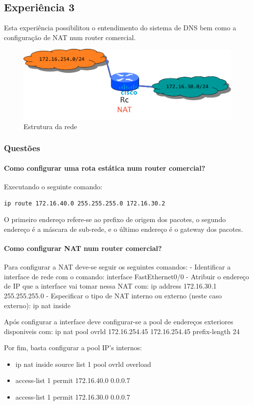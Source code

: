 \subsection{Experiência 3}

Esta experiência possibilitou o entendimento do sistema de DNS bem como a configuração de NAT num router comercial.

\begin{figure}[!h]
\centering
  \includegraphics[width=.4\linewidth]{img/net-routing-nat-cisco.png}
  \caption{Estrutura da rede}
\end{figure}

\subsubsection{Questões}

\paragraph{Como configurar uma rota estática num router comercial?}

Executando o seguinte comando:  
    \begin{center} \lstinline{ip route 172.16.40.0 255.255.255.0 172.16.30.2} \end{center}

O primeiro endereço refere-se ao prefixo de origem dos pacotes, o segundo endereço é a máscara de sub-rede, e o último endereço é o gateway dos pacotes.

\paragraph{Como configurar NAT num router comercial?}
Para configurar a NAT deve-se seguir os seguintes comandos:
 - Identificar a interface de rede com o comando: interface FastEthernet0/0
 - Atribuir o endereço de IP que a interface vai tomar nessa NAT com: ip address 172.16.30.1 255.255.255.0
 - Especificar o tipo de NAT interno ou externo (neste caso externo): ip nat inside

Após configurar a interface deve configurar-se a pool de endereços exteriores disponiveis com: ip nat pool ovrld 172.16.254.45 172.16.254.45 prefix-length 24

Por fim, basta configurar a pool IP's internos:
\begin{itemize}
    \item ip nat inside source list 1 pool ovrld overload
    \item access-list 1 permit 172.16.40.0 0.0.0.7
    \item access-list 1 permit 172.16.30.0 0.0.0.7
\end{itemize}


